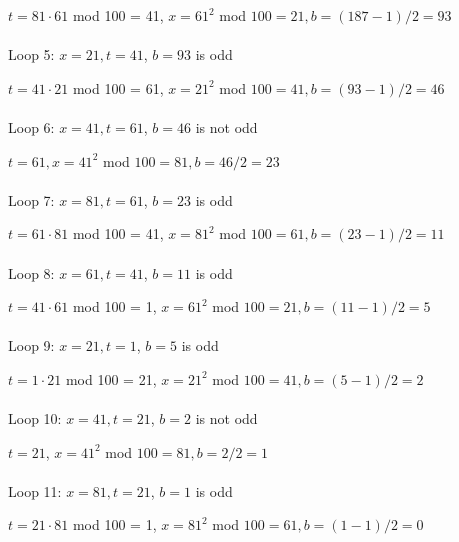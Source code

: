 \documentclass[12pt]{article}
\begin{document}
$t = 81 \cdot 61$ mod 100 = 41, $x = 61^2$ mod $100 = 21, b = (187-1)/2 = 93$
\\
\\
\noindent Loop 5: $x = 21, t = 41$, $b = 93$ is odd

$t = 41 \cdot 21$ mod 100 = 61, $x = 21^2$ mod $100 = 41, b = (93-1)/2 = 46$
\\
\\
\noindent Loop 6: $x = 41, t = 61$, $b = 46$ is not odd

$t = 61, x = 41^2$ mod $100 = 81, b = 46/2 = 23$
\\
\\
\noindent Loop 7: $x = 81, t = 61$, $b = 23$ is odd

$t = 61 \cdot 81$ mod 100 = 41, $x = 81^2$ mod $100 = 61, b = (23-1)/2 = 11$
\\
\\
\noindent Loop 8: $x = 61, t = 41$, $b = 11$ is odd

$t = 41 \cdot 61$ mod 100 = 1, $x = 61^2$ mod $100 = 21, b = (11-1)/2 = 5$
\\
\\
\noindent Loop 9: $x = 21, t = 1$, $b = 5$ is odd

$t = 1 \cdot 21$ mod 100 = 21, $x = 21^2$ mod $100 = 41, b = (5-1)/2 = 2$
\\
\\
\noindent Loop 10: $x = 41, t = 21$, $b = 2$ is not odd

$t = 21$, $x = 41^2$ mod $100 = 81, b = 2/2 = 1$
\\
\\
\noindent Loop 11: $x = 81, t = 21$, $b = 1$ is odd

$t = 21 \cdot 81$ mod 100 = 1, $x = 81^2$ mod $100 = 61, b = (1-1)/2 = 0$
\end{document}

